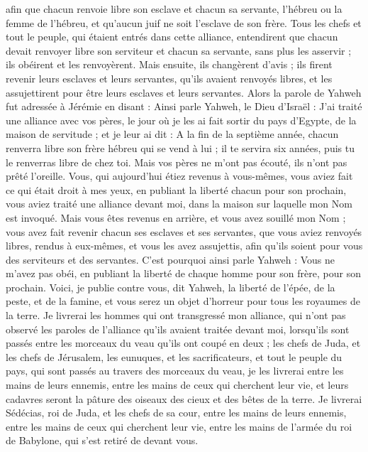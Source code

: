 \begin{multicols}{2}
afin que chacun renvoie libre son esclave et chacun sa servante, l'hébreu ou la femme de l'hébreu, et qu'aucun juif ne soit l'esclave de son frère.
Tous les chefs et tout le peuple, qui étaient entrés dans cette alliance, entendirent que chacun devait renvoyer libre son serviteur et chacun sa servante, sans plus les asservir ; ils obéirent et les renvoyèrent.
Mais ensuite, ils changèrent d'avis ; ils firent revenir leurs esclaves et leurs servantes, qu'ils avaient renvoyés libres, et les assujettirent pour être leurs esclaves et leurs servantes.
Alors la parole de Yahweh fut adressée à Jérémie en disant :
Ainsi parle Yahweh, le Dieu d'Israël : J'ai traité une alliance avec vos pères, le jour où je les ai fait sortir du pays d'Egypte, de la maison de servitude ; et je leur ai dit :
A la fin de la septième année, chacun renverra libre son frère hébreu qui se vend à lui ; il te servira six années, puis tu le renverras libre de chez toi. Mais vos pères ne m'ont pas écouté, ils n'ont pas prêté l'oreille.
Vous, qui aujourd'hui étiez revenus à vous-mêmes, vous aviez fait ce qui était droit à mes yeux, en publiant la liberté chacun pour son prochain, vous aviez traité une alliance devant moi, dans la maison sur laquelle mon Nom est invoqué.
Mais vous êtes revenus en arrière, et vous avez souillé mon Nom ; vous avez fait revenir chacun ses esclaves et ses servantes, que vous aviez renvoyés libres, rendus à eux-mêmes, et vous les avez assujettis, afin qu'ils soient pour vous des serviteurs et des servantes.
C'est pourquoi ainsi parle Yahweh : Vous ne m'avez pas obéi, en publiant la liberté de chaque homme pour son frère, pour son prochain. Voici, je publie contre vous, dit Yahweh, la liberté de l'épée, de la peste, et de la famine, et vous serez un objet d'horreur pour tous les royaumes de la terre.
Je livrerai les hommes qui ont transgressé mon alliance, qui n'ont pas observé les paroles de l'alliance qu'ils avaient traitée devant moi, lorsqu'ils sont passés entre les morceaux du veau qu'ils ont coupé en deux ;
les chefs de Juda, et les chefs de Jérusalem, les eunuques, et les sacrificateurs, et tout le peuple du pays, qui sont passés au travers des morceaux du veau,
je les livrerai entre les mains de leurs ennemis, entre les mains de ceux qui cherchent leur vie, et leurs cadavres seront la pâture des oiseaux des cieux et des bêtes de la terre.
Je livrerai Sédécias, roi de Juda, et les chefs de sa cour, entre les mains de leurs ennemis, entre les mains de ceux qui cherchent leur vie, entre les mains de l'armée du roi de Babylone, qui s'est retiré de devant vous.

\end{multicols}
